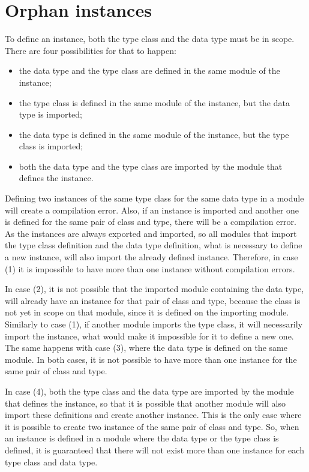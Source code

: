 \documentclass[msc]{ppgccufmg}
\begin{document}
\section{Orphan instances}
\label{Orphan-instances}

To define an instance, both the type class and the data type must be in scope.  There are four possibilities for that to happen:
\begin{itemize}
\item the data type and the type class are defined in the same module of the instance;
\item the type class is defined in the same module of the instance, but the data type is imported;
\item the data type is defined in the same module of the instance, but the type class is imported;
\item both the data type and the type class are imported by the module that defines the instance.
\end{itemize}
Defining two instances of the same type class for the same data type in a module will create a compilation error.
Also, if an instance is imported and another one is defined for the same pair of class and type, there will be a compilation error.
As the instances are always exported and imported, so all modules that import the type class definition and the data type definition, what is necessary to define a new instance, will also import the already defined instance.
Therefore, in case (1) it is impossible to have more than one instance without compilation errors.

In case (2), it is not possible that the imported module containing the data type, will already have an instance for that pair of class and type, because the class is not yet in scope on that module, since it is defined on the importing module.
Similarly to case (1), if another module imports the type class, it will necessarily import the instance, what would make it impossible for it to define a new one.
The same happens with case (3), where the data type is defined on the same module.
In both cases, it is not possible to have more than one instance for the same pair of class and type.

In case (4), both the type class and the data type are imported by the module that defines the instance, so that it is possible that another module will also import these definitions and create another instance.
This is the only case where it is possible to create two instance of the same pair of class and type.
So, when an instance is defined in a module where the data type or the type class is defined, it is guaranteed that there will not exist more than one instance for each type class and data type.
\end{document}
